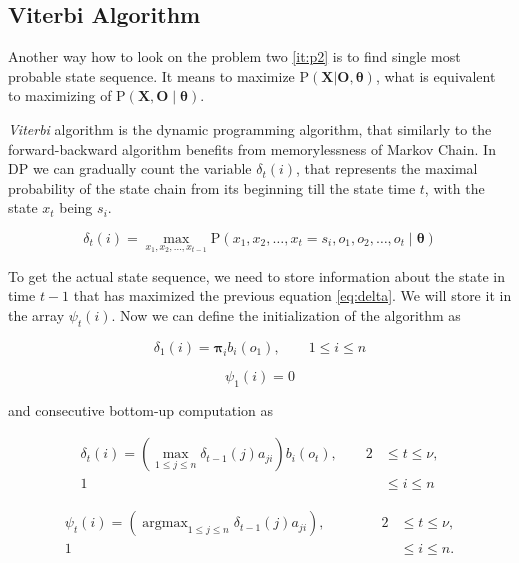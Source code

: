 \documentclass[thesis=M,english]{FITthesis}[2012/10/20]
\newcommand{\matr}[1]{\mathbf{#1}}
\newcommand{\argmax}{\mathop{\mathrm{argmax}}}
\begin{document}
\subsection{Viterbi Algorithm}\label{sec:viterbi}  

Another way how to look on the problem two \ref{it:p2} is to find single most probable state sequence. It means to maximize $\mathrm{P}(\matr{X} | \matr{O},\boldsymbol{\theta})$, what is equivalent to maximizing of $\mathrm{P}(\matr{X},\matr{O} \mid \boldsymbol{\theta})$.

\textit{Viterbi} algorithm is the dynamic programming algorithm, that similarly to the forward-backward algorithm  benefits from memorylessness of Markov Chain. In DP we can gradually count the variable $\delta_t(i)$, that represents the maximal probability of the state chain from its beginning till the state time $t$, with the state $x_{t}$  being $s_i$.

\begin{equation}\label{eq:delta}
\delta_t(i) = \max_{x_1,x_2,\dots,x_{t-1}} \mathrm{P}( x_1,x_2,\dots, x_t = s_i, o_1, o_2, \dots, o_t \mid \boldsymbol{\theta} )
\end{equation} 

To get the actual state sequence, we need to store information about the state in time $t-1$ that has maximized the previous equation \eqref{eq:delta}. We will store it in the array $\psi_t(i)$. Now we can define the initialization of the algorithm as

\begin{equation}
\delta_1(i) = \boldsymbol\pi_i b_i(o_1), \qquad 1 \leq i \leq n 
\end{equation}

\begin{equation}
\psi_1(i) = 0 
\end{equation}

and consecutive bottom-up computation as

\begin{equation}
\begin{aligned}
\delta_{t}(i) = ( \max_{ 1 \leq j \leq n } \delta_{t-1}(j)a_{ji} ) b_i(o_{t}), \qquad 2& \leq t \leq \nu, \\
																					   1& \leq i \leq n
\end{aligned}
\end{equation}

\begin{equation}
\begin{aligned}
\psi_{t}(i) = ( \argmax_{ 1 \leq j \leq n } \delta_{t-1}(j)a_{ji} ), \qquad \qquad 2& \leq t \leq \nu, \\
																			       1& \leq i \leq n.
\end{aligned}
\end{equation}
\end{document}
